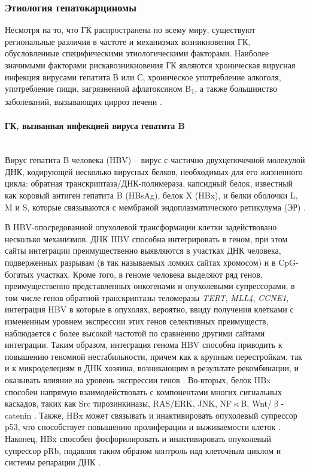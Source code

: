 \subsubsection{Этиология гепатокарциномы}

Несмотря на то, что ГК распространена по всему миру, существуют региональные различия в частоте и механизмах возникновения ГК, обусловленные специфическими этиологическими факторами. Наиболее значимыми факторами рискавозникновения ГК являются хроническая вирусная инфекция вирусами гепатита В или С, хроническое употребление алкоголя, употребление пищи, загрязненной афлатоксином B\textsubscript{1}, а также большинство заболеваний, вызывающих цирроз печени \cite{farazi_hepatocellular_2006}.

\paragraph{ГК, вызванная инфекцией вируса гепатита B}\mbox{}\\

Вирус гепатита B человека (HBV) – вирус с частично двухцепочечной молекулой ДНК, кодирующей несколько вирусных белков, необходимых для его жизненного цикла: обратная транскриптаза/ДНК-полимераза, капсидный белок, известный как коровый антиген гепатита B (HBsAg), белок X (HBx), и белки оболочки L, M и S, которые связываются с мембраной эндоплазматического ретикулума (ЭР) \cite{farazi_hepatocellular_2006}. 

В HBV-опосредованной опухолевой трансформации клетки задействовано несколько механизмов. ДНК HBV способна интегрировать в геном, при этом сайты интеграции преимущественно выявляются в участках ДНК человека, подверженных разрывам (в так называемых ломких сайтах хромосом) и в CpG-богатых участках. Кроме того, в геноме человека выделяют ряд генов, преимущественно представленных онкогенами и опухолевыми супрессорами, в том числе генов обратной транскриптазы теломеразы \textit{TERT}, \textit{MLL4}, \textit{CCNE1}, интеграция HBV в которые в опухолях, вероятно, ввиду получения клетками с измененным уровнем экспрессии этих генов селективных преимуществ, наблюдается с более высокой частотой по сравнению другими сайтами интеграции. Таким образом, интеграция генома HBV способна приводить к повышению геномной нестабильности, причем как к крупным перестройкам, так и к микроделециям в ДНК хозяина, возникающим в результате рекомбинации, и оказывать влияние на уровень экспрессии генов \cite{tokino_chromosome_1991, zhao_genomic_2016}. Во-вторых, белок HBx способен напрямую взаимодействовать с компонентами многих сигнальных каскадов, таких как Src тирозинкиназы, RAS/ERK, JNK, NF$\upkappa$B, Wnt/$\upbeta$-catenin \cite{feitelson_genetic_2002}. Также, HBx может связывать и инактивировать опухолевый супрессор p53, что способствует повышению пролиферации и выживаемости клеток \cite{feitelson_genetic_2002}. Наконец, HBx способен фосфорилировать и инактивировать опухолевый супрессор рRb, подавляя таким образом контроль над клеточным циклом и системы репарации ДНК \cite{arzumanyan_pathogenic_2013}.

